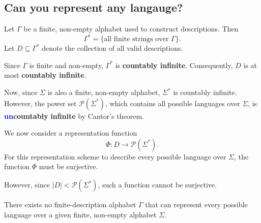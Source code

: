 \documentclass[10pt,a4paper]{article}
\begin{document}
\subsection{Can you represent any langauge?}
Let $\Gamma$ be a finite, non-empty alphabet used to construct descriptions. Then
\[
    \Gamma^*=\{\text{all finite strings over }\Gamma\}.
\]
Let \(D\subseteq\Gamma^*\) denote the collection of all valid descriptions.

Since $\Gamma$ is finite and non-empty, $\Gamma^*$ is \textcolor{red!60!black}{\textbf{countably infinite}}. Consequently, $D$ is at most \textcolor{red!60!black}{\textbf{countably infinite}}.

Now, since $\Sigma$ is also a finite, non-empty alphabet, $\Sigma^*$ is countably infinite. However, the power set $\mathcal{P}(\Sigma^*)$, which contains all possible languages over $\Sigma$, is \textcolor{blue}{\textbf{un}}\textcolor{red!60!black}{\textbf{countably}} \textcolor{red!60!black}{\textbf{infinite}} by Cantor's theorem.

We now consider a representation function
\[
    \Phi:D\longrightarrow\mathcal{P}(\Sigma^*).
\]
For this representation scheme to describe every possible language over $\Sigma$, the function $\Phi$ must be surjective.

However, since \(|D| <\mathcal{P}(\Sigma^*)\), such a function cannot be surjective. 
\begin{theorem}
There exists no finite-description alphabet $\Gamma$ that can represent every possible language over a given finite, non-empty alphabet $\Sigma$.
\end{theorem}
\end{document}
